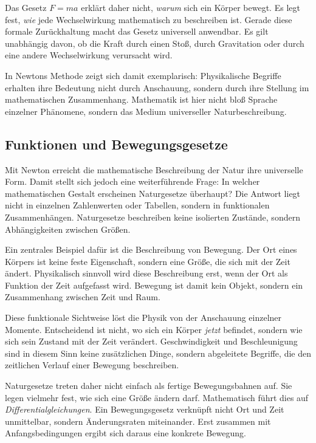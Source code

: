 Das Gesetz \(F = m a\) erklärt daher nicht,
\emph{warum} sich ein Körper bewegt.
Es legt fest,
\emph{wie} jede Wechselwirkung
mathematisch zu beschreiben ist.
Gerade diese formale Zurückhaltung
macht das Gesetz universell anwendbar.
Es gilt unabhängig davon,
ob die Kraft durch einen Stoß,
durch Gravitation
oder durch eine andere Wechselwirkung verursacht wird.

In Newtons Methode zeigt sich damit exemplarisch:
Physikalische Begriffe erhalten ihre Bedeutung
nicht durch Anschauung,
sondern durch ihre Stellung im mathematischen Zusammenhang.
Mathematik
ist hier nicht bloß Sprache einzelner Phänomene,
sondern das Medium universeller Naturbeschreibung.
\subsection{Funktionen und Bewegungsgesetze}

Mit Newton erreicht die mathematische Beschreibung der Natur ihre universelle Form.
Damit stellt sich jedoch eine weiterführende Frage:
In welcher mathematischen Gestalt erscheinen Naturgesetze überhaupt?
Die Antwort liegt nicht in einzelnen Zahlenwerten oder Tabellen,
sondern in funktionalen Zusammenhängen.
Naturgesetze beschreiben keine isolierten Zustände,
sondern Abhängigkeiten zwischen Größen.

Ein zentrales Beispiel dafür ist die Beschreibung von Bewegung.
Der Ort eines Körpers ist keine feste Eigenschaft,
sondern eine Größe, die sich mit der Zeit ändert.
Physikalisch sinnvoll wird diese Beschreibung erst,
wenn der Ort als Funktion der Zeit aufgefasst wird.
Bewegung ist damit kein Objekt,
sondern ein Zusammenhang zwischen Zeit und Raum.

Diese funktionale Sichtweise löst die Physik
von der Anschauung einzelner Momente.
Entscheidend ist nicht,
wo sich ein Körper \emph{jetzt} befindet,
sondern wie sich sein Zustand mit der Zeit verändert.
Geschwindigkeit
und Beschleunigung
sind in diesem Sinn keine zusätzlichen Dinge,
sondern abgeleitete Begriffe,
die den zeitlichen Verlauf einer Bewegung beschreiben.

Naturgesetze treten daher nicht einfach als fertige Bewegungsbahnen auf.
Sie legen vielmehr fest,
wie sich eine Größe ändern darf.
Mathematisch führt dies auf \emph{Differentialgleichungen}.
Ein Bewegungsgesetz
verknüpft nicht Ort und Zeit unmittelbar,
sondern Änderungsraten miteinander.
Erst zusammen mit Anfangsbedingungen
ergibt sich daraus eine konkrete Bewegung.

